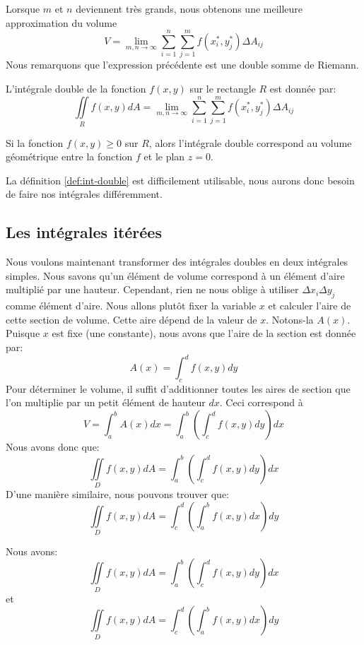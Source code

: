 \documentclass[]{book}
\theoremstyle{definition}
\theoremstyle{definition}
\theoremstyle{definition}
\theoremstyle{remark}
\let\BeginKnitrBlock\begin \let\EndKnitrBlock\end
\begin{document}
Lorsque \(m\) et \(n\) deviennent très grands, nous obtenons une
meilleure approximation du volume
\[V=\lim_{m,n\to\infty}\sum_{i=1}^{n}\sum_{j=1}^m f(x_i^*,y_j^*)\Delta A_{ij}\]
Nous remarquons que l'expression précédente est une double somme de
Riemann. \BeginKnitrBlock{definition}

\protect\hypertarget{def:int-double}{}{\label{def:int-double} }L'intégrale
double de la fonction \(f(x,y)\) sur le rectangle \(R\) est donnée par:
\[\iint\limits_R f(x,y)dA = \lim_{m,n\to\infty}\sum_{i=1}^{n}\sum_{j=1}^m f(x_i^*,y_j^*)\Delta A_{ij}\]
\EndKnitrBlock{definition}

\BeginKnitrBlock{remark}
{}Si la fonction \(f(x,y)\geq 0\) sur \(R\),
alors l'intégrale double correspond au volume géométrique entre la
fonction \(f\) et le plan \(z=0\).
\EndKnitrBlock{remark}

La définition \ref{def:int-double} est difficilement utilisable, nous
aurons donc besoin de faire nos intégrales différemment.

\hypertarget{integrales-iterees}{%
\subsection{Les intégrales itérées}\label{integrales-iterees}}

Nous voulons maintenant transformer des intégrales doubles en deux
intégrales simples. Nous savons qu'un élément de volume correspond à un
élément d'aire multiplié par une hauteur. Cependant, rien ne nous oblige
à utiliser \(\Delta x_i\Delta y_j\) comme élément d'aire. Nous allons
plutôt fixer la variable \(x\) et calculer l'aire de cette section de
volume. Cette aire dépend de la valeur de \(x\). Notons-la \(A(x)\).
Puisque \(x\) est fixe (une constante), nous avons que l'aire de la
section est donnée par: \[A(x)=\int_c^{d} f(x,y)dy\] Pour déterminer le
volume, il suffit d'additionner toutes les aires de section que l'on
multiplie par un petit élément de hauteur \(dx\). Ceci correspond à
\[V=\int_a^b A(x)dx=\int_a^b\left(\int_c^{d} f(x,y)dy\right)dx\] Nous
avons donc
que:\[\iint\limits_D f(x,y) dA=\int_a^b\left(\int_c^{d} f(x,y)dy\right)dx\]
D'une manière similaire, nous pouvons trouver que:
\[\iint\limits_D f(x,y) dA=\int_c^d\left(\int_a^{b} f(x,y)dx\right)dy\]
\BeginKnitrBlock{definition}[Intégrales doubles itérées]
\protect\hypertarget{def:integrale-double-iteree}{}{\label{def:integrale-double-iteree}
{} }Nous avons:
\[\iint\limits_D f(x,y) dA=\int_a^b\left(\int_c^{d} f(x,y)dy\right)dx\]
et
\[\iint\limits_D f(x,y) dA=\int_c^d\left(\int_a^{b} f(x,y)dx\right)dy\]
\EndKnitrBlock{definition}
\end{document}
